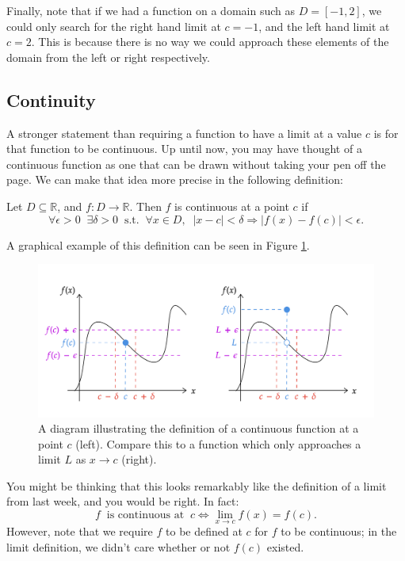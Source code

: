 \documentclass[
  10pt,
  a4paper]{article}
\theoremstyle{plain}
\theoremstyle{definition}
\theoremstyle{plain}
\theoremstyle{plain}
\theoremstyle{plain}
\theoremstyle{plain}
\theoremstyle{definition}
\theoremstyle{definition}
\theoremstyle{remark}
\theoremstyle{remark}
\let\BeginKnitrBlock\begin \let\EndKnitrBlock\end
\begin{document}
Finally, note that if we had a function on a domain such as \(D = [-1,2]\), we could only search for the right hand limit at \(c = -1\), and the left hand limit at \(c = 2\). This is because there is no way we could approach these elements of the domain from the left or right respectively.

\hypertarget{continuity}{%
\subsection{Continuity}\label{continuity}}

A stronger statement than requiring a function to have a limit at a value \(c\) is for that function to be continuous. Up until now, you may have thought of a continuous function as one that can be drawn without taking your pen off the page. We can make that idea more precise in the following definition:

\BeginKnitrBlock{definition}[Continuity]
{\label{def:def2} }Let \(D \subseteq \mathbb{R}\), and \(f: D \to \mathbb{R}\). Then \(f\) is continuous at a point \(c\) if \[\forall \epsilon > 0\;\;\exists \delta > 0\;\;\text{s.t.}\;\;\forall x \in D,\;\; \lvert x - c \rvert < \delta \Rightarrow \lvert f(x) - f(c) \rvert < \epsilon.\]
\EndKnitrBlock{definition}

A graphical example of this definition can be seen in Figure \ref{fig:cont}.

\begin{figure}
\includegraphics{Continuity} \caption{A diagram illustrating the definition of a continuous function at a point $c$ (left). Compare this to a function which only approaches a limit $L$ as $x \to c$ (right).}\label{fig:cont}
\end{figure}

You might be thinking that this looks remarkably like the definition of a limit from last week, and you would be right. In fact: \[f\;\;\text{is continuous at}\;\; c \Longleftrightarrow \lim_{x \to c}f(x) = f(c).\] However, note that we require \(f\) to be defined at \(c\) for \(f\) to be continuous; in the limit definition, we didn't care whether or not \(f(c)\) existed.
\end{document}
